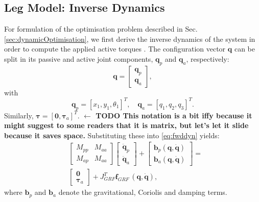 \documentclass[letterpaper, 10 pt, conference]{ieeeconf}  %
\begin{document}
	\subsection{Leg Model: Inverse Dynamics}
	For formulation of the optimisation problem described in Sec. \ref{sec:dynamicOptimisation}, we first derive the inverse dynamics of the system in order to compute the applied active torques \cite{nakanishi2007inverse}. The configuration vector $\mathbf{q}$ can be split in its passive and active joint components, $\mathbf{q}_p$ and $\mathbf{q}_a$, respectively:
	\begin{equation}
	\mathbf{q} =
	\begin{bmatrix}
	\mathbf{q}_p \\
	\mathbf{q}_a
	\end{bmatrix},
	\end{equation}
	with
	\begin{equation}
	\mathbf{q}_p = [x_1,y_1,\theta_1]^T, \quad  
	\mathbf{q}_a = [q_1,q_2,q_3]^T.
	\end{equation}
	\noindent
	Similarly, $\boldsymbol{\tau} = \left[\mathbf{0},\boldsymbol{\tau}_a\right]^T$. \textbf{$\leftarrow$ TODO This notation is a bit iffy because it might suggest to some readers that it is matrix, but let's let it slide because it saves space.}
	Substituting these into \eqref{eq:fwddyn} yields:
	\begin{equation}
	\begin{aligned}
	&\left[\begin{array}{cc}  
	M_{pp} & M_{aa}\\
	M_{ap} & M_{aa}
	\end{array} \right]
	\left[\begin{array}{c}  
	\mathbf{\ddot q}_p\\
	\mathbf{\ddot q}_a
	\end{array} \right] +
	\left[\begin{array}{c}  
	\mathbf{b}_p \mathbf{(q,\dot q)}\\
	\mathbf{b}_a \mathbf{(q,\dot q)}
	\end{array} \right] 
	=\\
	&\left[\begin{array}{c}  
	\mathbf{0}\\
	\boldsymbol{\tau}_a
	\end{array} \right] 
	+
	J_{GRF}^T \mathbf{f}_{GRF} \, \mathbf{(q, \dot q)},
	\end{aligned}
	\label{eq:ik}
	\end{equation}		
	where $\mathbf{b}_p$ and $\mathbf{b}_a$ denote the gravitational, Coriolis and damping terms. 
\end{document}
